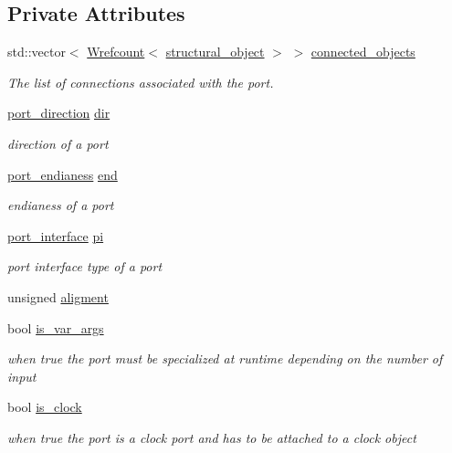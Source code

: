\subsection*{Private Attributes}
\begin{DoxyCompactItemize}
\item 
std\+::vector$<$ \hyperlink{classWrefcount}{Wrefcount}$<$ \hyperlink{classstructural__object}{structural\+\_\+object} $>$ $>$ \hyperlink{structport__o_affd660e60f0124cebc4648cd92b34ca1}{connected\+\_\+objects}
\begin{DoxyCompactList}\small\item\em The list of connections associated with the port. \end{DoxyCompactList}\item 
\hyperlink{structport__o_adb254df5665ff28b0769491cc3899fd5}{port\+\_\+direction} \hyperlink{structport__o_a27f4a8d47d3f3b064d72443da1ee450c}{dir}
\begin{DoxyCompactList}\small\item\em direction of a port \end{DoxyCompactList}\item 
\hyperlink{structport__o_a7f16c53245215df0064e1b8ef27a36e3}{port\+\_\+endianess} \hyperlink{structport__o_a1d392170891caecd4e6a4888b25cec38}{end}
\begin{DoxyCompactList}\small\item\em endianess of a port \end{DoxyCompactList}\item 
\hyperlink{structport__o_a37d2e6a450aea997028478f5bfb4e1f6}{port\+\_\+interface} \hyperlink{structport__o_ae8736b3b15c2828aa9908d25781d028e}{pi}
\begin{DoxyCompactList}\small\item\em port interface type of a port \end{DoxyCompactList}\item 
unsigned \hyperlink{structport__o_a92034459d17e4e8b36396d35f877be19}{aligment}
\item 
bool \hyperlink{structport__o_a6f9652fa41e44cf518ea9f8c3383b984}{is\+\_\+var\+\_\+args}
\begin{DoxyCompactList}\small\item\em when true the port must be specialized at runtime depending on the number of input \end{DoxyCompactList}\item 
bool \hyperlink{structport__o_a3bc1e20ec9d3fa89a5561ce5a8d976b1}{is\+\_\+clock}
\begin{DoxyCompactList}\small\item\em when true the port is a clock port and has to be attached to a clock object \end{DoxyCompactList}\item 

\end{DoxyCompactItemize}
